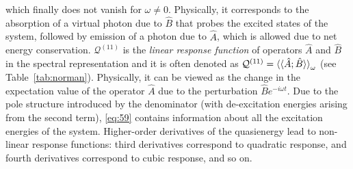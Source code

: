 \documentclass[%
class = book,%
crop = false,%
float = true,%
multi = true,%
preview = false,%
]{standalone}
\newcommand{\caps}[1]{\uppercase{#1}}
\begin{document}
which finally does not vanish for \(\omega \neq 0\). Physically, it corresponds to the absorption of a virtual photon due to \(\hat{B}\) that probes the excited states of the system, followed by emission of a photon due to \(\hat{A}\), which is allowed due to net energy conservation. \(\mathcal{Q}^{(11)}\) is the \emph{linear response function} of operators \(\hat{A}\) and \(\hat{B}\) in the spectral representation and it is often denoted as \(\mathcal{Q}^{(11)} = \braket{\braket{\hat{A};\hat{B}}}_{\omega}\) (see Table~\ref{tab:norman}). Physically, it can be viewed as the change in the expectation value of the operator \(\hat{A}\) due to the perturbation \(\hat{B}e^{-i\omega t}\). Due to the pole structure introduced by the denominator (with de-excitation energies arising from the second term), \eqref{eq:59} contains information about all the excitation energies of the system. Higher-order derivatives of the quasienergy lead to non-linear response functions: third derivatives correspond to quadratic response, and fourth derivatives correspond to cubic response, and so on.



\end{document}
